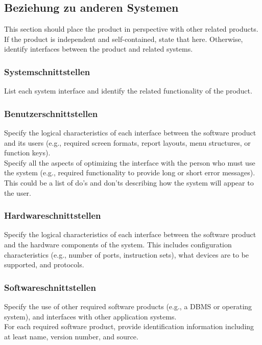 \subsection{Beziehung zu anderen Systemen}
This section should place the product in perspective with other related products. If the product is independent and self-contained, state that here. Otherwise, identify interfaces between the product and related systems.

\subsubsection{Systemschnittstellen}
List each system interface and identify the related functionality of the product.

\subsubsection{Benutzerschnittstellen}
Specify the logical characteristics of each interface between the software product and its users (e.g., required screen formats, report layouts, menu structures, or function keys). \\[-0.3cm]

\noindent Specify all the aspects of optimizing the interface with the person who must use the system (e.g., required functionality to provide long or short error messages). This could be a list of do’s and don’ts describing how the system will appear to the user.

\subsubsection{Hardwareschnittstellen}
Specify the logical characteristics of each interface between the software product and the hardware components of the system. This includes configuration characteristics (e.g., number of ports, instruction sets), what devices are to be supported, and protocols.

\subsubsection{Softwareschnittstellen}
Specify the use of other required software products (e.g., a DBMS or operating system), and interfaces with other application systems. \\[-0.3cm]

\noindent For each required software product, provide identification information including at least name, version number, and source. \\[-0.3cm]

